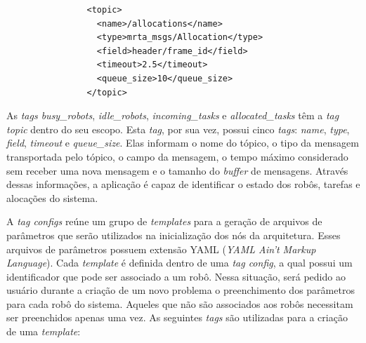             \begin{lstlisting}
                <topic>
                  <name>/allocations</name>
                  <type>mrta_msgs/Allocation</type>
                  <field>header/frame_id</field>
                  <timeout>2.5</timeout>
                  <queue_size>10</queue_size>
                </topic>
            \end{lstlisting}
            
            As \textit{tags busy\_robots}, \textit{idle\_robots}, \textit{incoming\_tasks} e \textit{allocated\_tasks} têm a \textit{tag topic} dentro do seu escopo. Esta \textit{tag}, por sua vez, possui cinco \textit{tags}: \textit{name}, \textit{type}, \textit{field}, \textit{timeout} e \textit{queue\_size}. Elas informam o nome do tópico, o tipo da mensagem transportada pelo tópico, o campo da mensagem, o tempo máximo considerado sem receber uma nova mensagem e o tamanho do \textit{buffer} de mensagens. Através dessas informações, a aplicação é capaz de identificar o estado dos robôs, tarefas e alocações do sistema.
            
            A \textit{tag configs} reúne um grupo de \textit{templates} para a geração de arquivos de parâmetros que serão utilizados na inicialização dos nós da arquitetura. Esses arquivos de parâmetros possuem extensão YAML (\textit{YAML Ain't Markup Language}). Cada \textit{template} é definida dentro de uma \textit{tag config}, a qual possui um identificador que pode ser associado a um robô. Nessa situação, será pedido ao usuário durante a criação de um novo problema o preenchimento dos parâmetros para cada robô do sistema. Aqueles que não são associados aos robôs necessitam ser preenchidos apenas uma vez. As seguintes \textit{tags} são utilizadas para a criação de uma \textit{template}:
            
